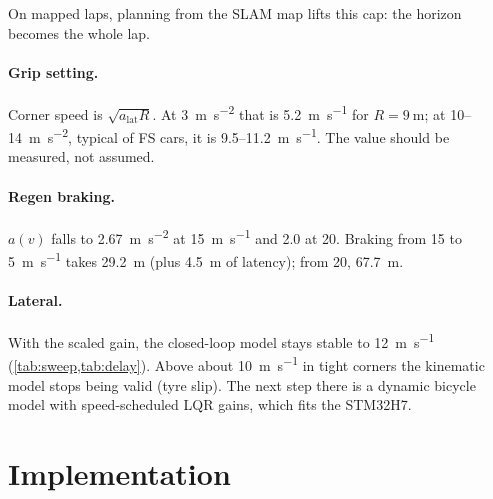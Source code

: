 \documentclass[11pt,a4paper]{article}
\begin{document}
On mapped laps, planning from the SLAM map lifts this cap: the horizon becomes the whole
lap.

\paragraph{Grip setting.} Corner speed is $\sqrt{a_{\text{lat}} R}$. At \SI{3}{\metre\per\second\squared}
that is \SI{5.2}{\metre\per\second} for $R = \SI{9}{\metre}$; at 10--\SI{14}{\metre\per\second\squared},
typical of FS cars, it is 9.5--\SI{11.2}{\metre\per\second}. The value should be measured,
not assumed.

\paragraph{Regen braking.} $a(v)$ falls to \SI{2.67}{\metre\per\second\squared} at
\SI{15}{\metre\per\second} and \SI{2.0}{} at \SI{20}{}. Braking from 15 to
\SI{5}{\metre\per\second} takes \SI{29.2}{\metre} (plus \SI{4.5}{\metre} of latency); from
20, \SI{67.7}{\metre}.

\paragraph{Lateral.} With the scaled gain, the closed-loop model stays stable to
\SI{12}{\metre\per\second} (\cref{tab:sweep,tab:delay}). Above about
\SI{10}{\metre\per\second} in tight corners the kinematic model stops being valid (tyre
slip). The next step there is a dynamic bicycle model with speed-scheduled LQR gains,
which fits the STM32H7.

\section{Implementation}
\begin{table}[h]
\centering\small
{}
\end{table}
\end{document}
